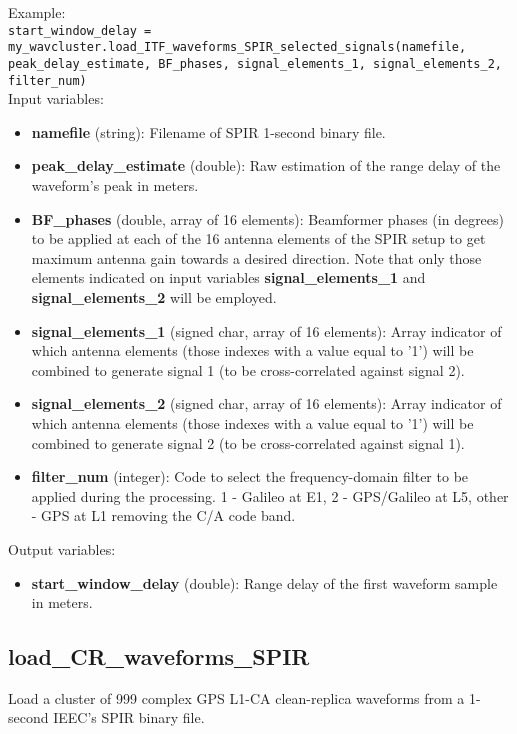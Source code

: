 Example:\\

\texttt{start\_window\_delay = my\_wavcluster.load\_ITF\_waveforms\_SPIR\_selected\_signals(namefile, peak\_delay\_estimate, BF\_phases, signal\_elements\_1, signal\_elements\_2, filter\_num)}\\

Input variables:
\begin{itemize}
\item {\bf namefile} (string): Filename of SPIR 1-second binary file.
\item {\bf peak\_delay\_estimate} (double): Raw estimation of the range delay of the waveform's peak in meters.
\item {\bf BF\_phases} (double, array of 16 elements): Beamformer phases (in degrees) to be applied at each of the 16 antenna elements of the SPIR setup to get maximum antenna gain towards a desired direction. Note that only those elements indicated on input variables {\bf signal\_elements\_1} and {\bf signal\_elements\_2} will be employed.
\item {\bf signal\_elements\_1} (signed char, array of 16 elements): Array indicator of which antenna elements (those indexes with a value equal to '1') will be combined to generate signal 1 (to be cross-correlated against signal 2).
\item {\bf signal\_elements\_2} (signed char, array of 16 elements): Array indicator of which antenna elements (those indexes with a value equal to '1') will be combined to generate signal 2 (to be cross-correlated against signal 1).
\item {\bf filter\_num} (integer): Code to select the frequency-domain filter to be applied during the processing. 1 - Galileo at E1, 2 - GPS/Galileo at L5, other - GPS at L1 removing the C/A code band. 
\end{itemize}

Output variables:
\begin{itemize}
\item {\bf start\_window\_delay} (double): Range delay of the first waveform sample in meters.
\end{itemize}


\subsection{load\_CR\_waveforms\_SPIR}

Load a cluster of 999 complex GPS L1-CA clean-replica waveforms from a 1-second IEEC's SPIR binary file.\\

